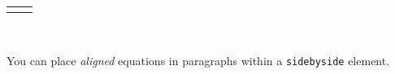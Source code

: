 \documentclass[10pt,]{article}
\theoremstyle{plain}
\theoremstyle{definition}
\theoremstyle{definition}
\theoremstyle{definition}
\theoremstyle{definition}
\theoremstyle{definition}
\theoremstyle{definition}
\numberwithin{equation}{section}
\newlength{\panelmax}
\begin{document}
{{{{}}}
\ifdefined\phAul\else\newlength{\phAul}\fi%
\setlength{\phAul}{\ht\panelboxAul+\dp\panelboxAul}
\settototalheight{\phAul}{\usebox{\panelboxAul}}
\setlength{\panelmax}{\maxof{\panelmax}{\phAul}}
\leavevmode%
\setlength{\tabcolsep}{0\linewidth}
\par\medskip\noindent
\begin{tabular}{@{}*{2}{c}@{}}
\begin{minipage}[c][\panelmax][t]{0.5\linewidth}\usebox{\panelboxAol}\end{minipage}&
\begin{minipage}[c][\panelmax][t]{0.5\linewidth}\usebox{\panelboxAul}\end{minipage}\end{tabular}\\
}%
\par
\hypertarget{p-710}{}%
You can place \emph{aligned} equations in paragraphs within a \lstinline?sidebyside? element.%
\end{document}
